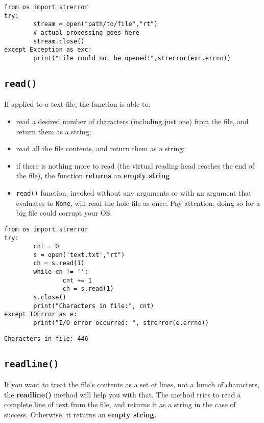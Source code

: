 \documentclass[11pt]{article}
\begin{document}
\begin{verbatim}
from os import strerror
try: 
        stream = open("path/to/file","rt")
        # actual processing goes here
        stream.close()
except Exception as exc:
        print("File could not be opened:",strerror(exc.errno))
\end{verbatim}

\subsection{\texttt{read()}}
\label{sec:org55ee13b}
If applied to a text file, the function is able to:

\begin{itemize}
\item read a desired number of characters (including just one) from the
file, and return them as a string;
\item read all the file contents, and return them as a string;
\item if there is nothing more to read (the virtual reading head reaches
the end of the file), the function \textbf{returns} an \textbf{empty string}.
\item \texttt{read()} function, invoked without any arguments or with an argument
that evaluates to \texttt{None}, will read the hole file as once. Pay
attention, doing so for a big file could corrupt your OS.
\end{itemize}


\begin{verbatim}
from os import strerror
try:
        cnt = 0
        s = open('text.txt',"rt")
        ch = s.read(1)
        while ch != '':
                cnt += 1
                ch = s.read(1)
        s.close()
        print("Characters in file:", cnt)
except IOError as e:
        print("I/O error occurred: ", strerror(e.errno))
\end{verbatim}

\begin{verbatim}
Characters in file: 446
\end{verbatim}

\subsection{\texttt{readline()}}
\label{sec:org498edfd}
If you want to treat the file’s contents as a set of lines, not a
bunch of characters, the \textbf{readline()} method will help you with that.
The method tries to read a complete line of text from the file, and
returns it as a string in the case of success. Otherwise, it returns
an \textbf{empty string.}
\end{document}
